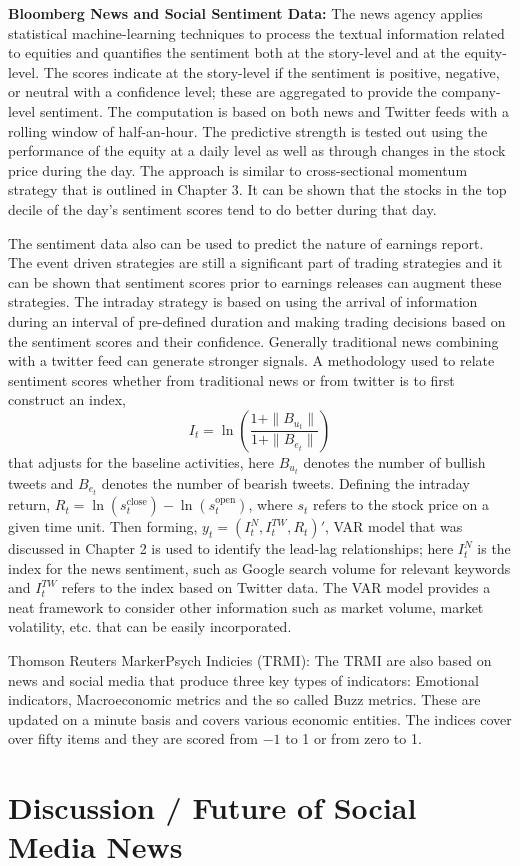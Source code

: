 \noindent \textbf{Bloomberg News and Social Sentiment Data:} The news agency applies statistical machine-learning techniques to process the textual information related to equities and quantifies the sentiment both at the story-level and at the equity-level. The scores indicate at the story-level if the sentiment is positive, negative, or neutral with a confidence level; these are aggregated to provide the company-level sentiment. The computation is based on both news and Twitter feeds with a rolling window of half-an-hour. The predictive strength is tested out using the performance of the equity at a daily level as well as through changes in the stock price during the day. The approach is similar to cross-sectional momentum strategy that is outlined in Chapter 3. It can be shown that the stocks in the top decile of the day's sentiment scores tend to do better during that day. 


The sentiment data also can be used to predict the nature of earnings report. The event driven strategies are still a significant part of trading strategies and it can be shown that sentiment scores prior to earnings releases can augment these strategies. The intraday strategy is based on using the arrival of information during an interval of pre-defined duration and making trading decisions based on the sentiment scores and their confidence. Generally traditional news combining with a twitter feed can generate stronger signals. A methodology used to relate sentiment scores whether from traditional news or from twitter is to first construct an index, 
	\begin{equation}\label{eqn:itwithln}
	I_t= \ln\left( \dfrac{1+\|B_{u_t}\|}{1+\| B_{e_t}\|}\right)
	\end{equation}  
that adjusts for the baseline activities, here $B_{u_t}$ denotes the number of bullish tweets and $B_{e_t}$ denotes the number of bearish tweets. Defining the intraday return, $R_t=\ln(s_t^{\text{close}}) - \ln(s_t^{\text{open}})$, where $s_t$ refers to the stock price on a given time unit. Then forming, $y_t=(I_t^N,I_t^{TW},R_t)'$, VAR model that was discussed in Chapter 2 is used to identify the lead-lag relationships; here $I_t^N$ is the index for the news sentiment, such as Google search volume for relevant keywords and $I_t^{TW}$ refers to the index based on Twitter data. The VAR model provides a neat framework to consider other information such as market volume, market volatility, etc. that can be easily incorporated. 


Thomson Reuters MarkerPsych Indicies (TRMI): The TRMI are also based on news and social media that produce three key types of indicators: Emotional indicators, Macroeconomic metrics and the so called Buzz metrics. These are updated on a minute basis and covers various economic entities. The indices cover over fifty items and they are scored from $-1$ to 1 or from zero to 1. 


\section{Discussion / Future of Social Media News}

